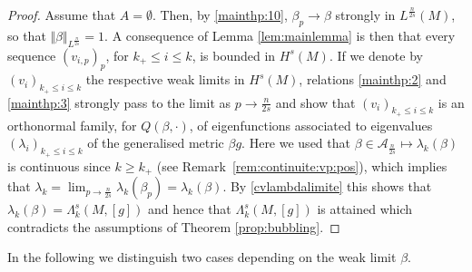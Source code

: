 \documentclass[10pt]{amsart}
\numberwithin{equation}{section}
\def\La{{\Lambda}}
\newcommand{\vp}{\varphi}
\theoremstyle{plain}
\theoremstyle{remark}
\begin{document}
\begin{proof}
Assume that $A = \emptyset$. Then, by \eqref{mainthp:10}, $\beta_p \to \beta$ strongly in $L^{\frac{n}{2s}}(M)$, so that $\Vert \beta \Vert_{L^{\frac{n}{2s}}} = 1$. A consequence of Lemma   \ref{lem:mainlemma} is then that every sequence $(v_{i,p})_p$, for $k_+ \le i \le k$, is bounded in $H^s(M)$. If we denote by $(v_i)_{k_+ \le i \le k }$ the respective weak limits in $H^s(M)$, relations \eqref{mainthp:2} and \eqref{mainthp:3} strongly pass to the limit as $p \to \frac{n}{2s}$ and show that $( v_i)_{k_+ \le i \le k}$ is an orthonormal family, for $Q(\beta, \cdot)$, of eigenfunctions associated to eigenvalues $(\lambda_i)_{k_+\le i \le k}$ of the generalised metric $\beta g$. Here we used that $\beta \in \mathcal{A}_{\frac{n}{2s}} \mapsto \lambda_k(\beta)$ is continuous since $k \ge k_+$ (see Remark~\ref{rem:continuite:vp:pos}), which implies that $ \lambda_k = \lim_{p \to \frac{n}{2s}} \lambda_k(\beta_p) = \lambda_k(\beta)$. By \eqref{cvlambdalimite} this shows that $\lambda_k(\beta) = \Lambda_k^s(M,[g])$ and hence that $ \Lambda_k^s(M,[g])$ is attained which contradicts the assumptions of Theorem  \ref{prop:bubbling}. 
\end{proof}


In the following we distinguish two cases depending on the weak limit $\beta$.
\end{document}
